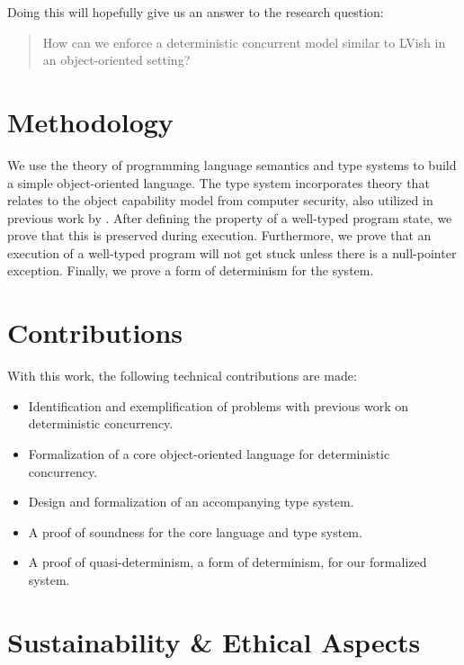 Doing this will hopefully give us an answer to the research question:

\begin{quotation}
  How can we enforce a deterministic concurrent model similar to LVish in an
  object-oriented setting?
\end{quotation}

\section{Methodology}%
\label{sec:methodology}

We use the theory of programming language semantics and type systems to build a
simple object-oriented language. The type system incorporates theory that
relates to the object capability model from computer security, also utilized in
previous work by \textcite{conf/oopsla/HallerL16}.  After defining the property
of a well-typed program state, we prove that this is preserved during execution.
Furthermore, we prove that an execution of a well-typed program will not get
stuck unless there is a null-pointer exception. Finally, we prove a form of
determinism for the system.

\section{Contributions}%
\label{sec:contributions}

With this work, the following technical contributions are made:
\begin{itemize}
  \item Identification and exemplification of  problems with previous work on
    deterministic concurrency.
  \item Formalization of a core object-oriented language for deterministic
    concurrency.
  \item Design and formalization of an accompanying type system.
  \item A proof of soundness for the core language and type system.
  \item A proof of quasi-determinism, a form of determinism, for our
    formalized system.
\end{itemize}

\section{Sustainability \& Ethical Aspects}%
\label{sec:sustainability_&_ethical_aspects}

